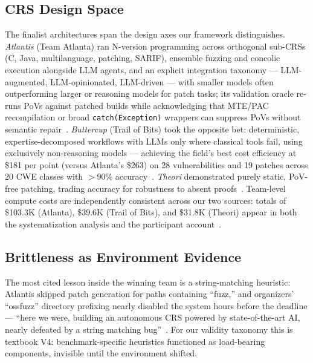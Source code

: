 \subsection{CRS Design Space}
The finalist architectures span the design axes our framework distinguishes.
\emph{Atlantis} (Team Atlanta) ran N-version programming across orthogonal sub-CRSs (C, Java,
multilanguage, patching, SARIF), ensemble fuzzing and concolic execution alongside LLM agents,
and an explicit integration taxonomy --- LLM-augmented, LLM-opinionated, LLM-driven ---
with smaller models often outperforming larger or reasoning models for patch tasks; its
validation oracle re-runs PoVs against patched builds while acknowledging that MTE/PAC
recompilation or broad \texttt{catch(Exception)} wrappers can suppress PoVs without semantic
repair~\cite{taafc2025}. \emph{Buttercup} (Trail of Bits) took the opposite bet:
deterministic, expertise-decomposed workflows with LLMs only where classical tools fail,
using exclusively non-reasoning models --- achieving the field's best cost efficiency at
\$181 per point (versus Atlanta's \$263) on 28 vulnerabilities and 19 patches across 20 CWE
classes with ${>}90\%$ accuracy~\cite{tobbuttercup2025,r7sokaixcc2026}. \emph{Theori}
demonstrated purely static, PoV-free patching, trading accuracy for robustness to absent
proofs~\cite{taafc2025}. Team-level compute costs are independently consistent across our two
sources: totals of \$103.3K (Atlanta), \$39.6K (Trail of Bits), and \$31.8K (Theori) appear in
both the systematization analysis and the participant account~\cite{r7sokaixcc2026,tobbuttercup2025}.

\subsection{Brittleness as Environment Evidence}
The most cited lesson inside the winning team is a string-matching heuristic: Atlantis skipped
patch generation for paths containing ``fuzz,'' and organizers' ``ossfuzz'' directory prefixing
nearly disabled the system hours before the deadline --- ``here we were, building an autonomous
CRS powered by state-of-the-art AI, nearly defeated by a string matching bug''~\cite{taafc2025}.
For our validity taxonomy this is textbook V4: benchmark-specific heuristics functioned as
load-bearing components, invisible until the environment shifted.

